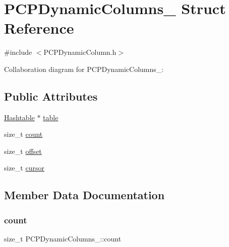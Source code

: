 \hypertarget{structPCPDynamicColumns__}{}\section{P\+C\+P\+Dynamic\+Columns\+\_\+ Struct Reference}
\label{structPCPDynamicColumns__}


{\ttfamily \#include $<$P\+C\+P\+Dynamic\+Column.\+h$>$}



Collaboration diagram for P\+C\+P\+Dynamic\+Columns\+\_\+\+:
\subsection*{Public Attributes}
\begin{DoxyCompactItemize}
\item 
\hyperlink{Hashtable_8h_af67f943dab16c5d7d465c18053edf47f}{Hashtable} $\ast$ \hyperlink{structPCPDynamicColumns___a000998daccef615fde6332b9c0be9349}{table}
\item 
size\+\_\+t \hyperlink{structPCPDynamicColumns___a54ee8c34dd6a3a782a1de37e57f5dda7}{count}
\item 
size\+\_\+t \hyperlink{structPCPDynamicColumns___a6078c36bcd42b8a3c17feff070daa684}{offset}
\item 
size\+\_\+t \hyperlink{structPCPDynamicColumns___a8bc600de923bc9c7274a6959d3201185}{cursor}
\end{DoxyCompactItemize}


\subsection{Member Data Documentation}
\mbox{\label{structPCPDynamicColumns___a54ee8c34dd6a3a782a1de37e57f5dda7}} 
\subsubsection{\texorpdfstring{count}{count}}
{\footnotesize\ttfamily size\+\_\+t P\+C\+P\+Dynamic\+Columns\+\_\+\+::count}

\mbox{\label{structPCPDynamicColumns___a8bc600de923bc9c7274a6959d3201185}} 
